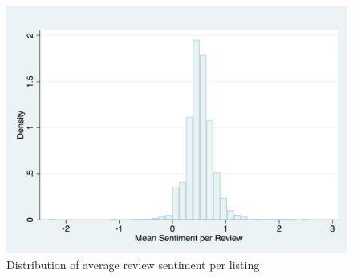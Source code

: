 \begin{figure}\centering
	\includegraphics[width=.8\textwidth]{figures/fig3_review_sentiment}
	\caption{Distribution of average review sentiment per listing}
	\label{fig:sentiment}
\end{figure}


